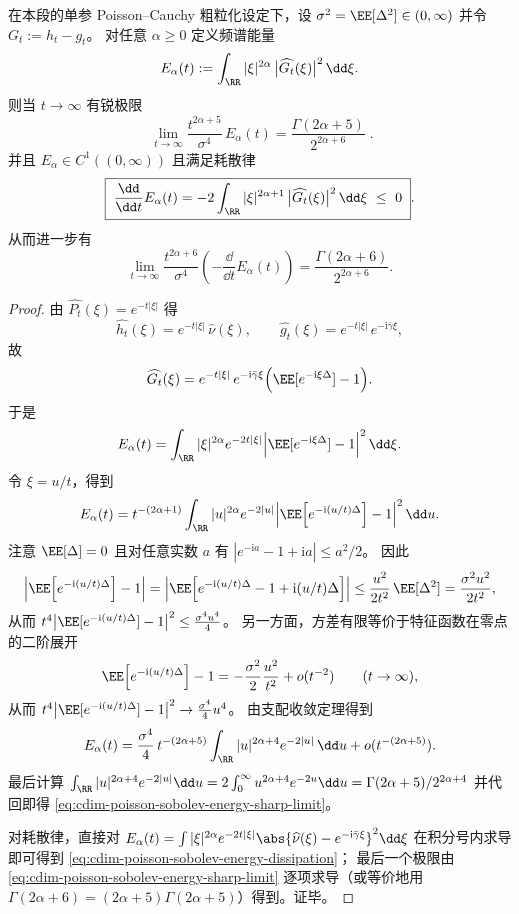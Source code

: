 \begin{proposition}\label{prop:cdim-poisson-sobolev-energy-sharp-limit}
在本段的单参 Poisson--Cauchy 粗粒化设定下，设 \(\sigma^2=\EE[\Delta^2]\in(0,\infty)\) 并令 \(G_t:=h_t-g_t\)。
对任意 \(\alpha\ge 0\) 定义频谱能量
\[
E_\alpha(t):=\int_{\RR}|\xi|^{2\alpha}\,\bigl|\widehat{G_t}(\xi)\bigr|^2\,\dd\xi.
\]
则当 \(t\to\infty\) 有锐极限
\begin{equation}\label{eq:cdim-poisson-sobolev-energy-sharp-limit}
\boxed{\;
\lim_{t\to\infty}\frac{t^{2\alpha+5}}{\sigma^4}\,E_\alpha(t)=\frac{\Gamma(2\alpha+5)}{2^{2\alpha+6}}\; }.
\end{equation}
并且 \(E_\alpha\in C^1((0,\infty))\) 且满足耗散律
\begin{equation}\label{eq:cdim-poisson-sobolev-energy-dissipation}
\boxed{\;
\frac{\dd}{\dd t}E_\alpha(t)=-2\int_{\RR}|\xi|^{2\alpha+1}\,\bigl|\widehat{G_t}(\xi)\bigr|^2\,\dd\xi\ \le\ 0\; }.
\end{equation}
从而进一步有
\[
\lim_{t\to\infty}\frac{t^{2\alpha+6}}{\sigma^4}\left(-\frac{\dd}{\dd t}E_\alpha(t)\right)
=\frac{\Gamma(2\alpha+6)}{2^{2\alpha+6}}.
\]
\end{proposition}
\begin{proof}
由 \(\widehat{P_t}(\xi)=e^{-t|\xi|}\) 得
\[
\widehat{h_t}(\xi)=e^{-t|\xi|}\,\widehat\nu(\xi),
\qquad
\widehat{g_t}(\xi)=e^{-t|\xi|}\,e^{-\mathrm{i}\bar\gamma\xi},
\]
故
\[
\widehat{G_t}(\xi)=e^{-t|\xi|}\,e^{-\mathrm{i}\bar\gamma\xi}\Bigl(\EE[e^{-\mathrm{i}\xi\Delta}]-1\Bigr).
\]
于是
\[
E_\alpha(t)=\int_{\RR}|\xi|^{2\alpha}e^{-2t|\xi|}\Bigl|\EE[e^{-\mathrm{i}\xi\Delta}]-1\Bigr|^2\,\dd\xi.
\]
令 \(\xi=u/t\)，得到
\[
E_\alpha(t)=t^{-(2\alpha+1)}\int_{\RR}|u|^{2\alpha}e^{-2|u|}\Bigl|\EE\!\left[e^{-\mathrm{i}(u/t)\Delta}\right]-1\Bigr|^2\,\dd u.
\]
注意 \(\EE[\Delta]=0\) 且对任意实数 \(a\) 有 \(|e^{-\mathrm{i}a}-1+\mathrm{i}a|\le a^2/2\)。
因此
\[
\left|\EE\!\left[e^{-\mathrm{i}(u/t)\Delta}\right]-1\right|
=\left|\EE\!\left[e^{-\mathrm{i}(u/t)\Delta}-1+\mathrm{i}(u/t)\Delta\right]\right|
\le \frac{u^2}{2t^2}\,\EE[\Delta^2]=\frac{\sigma^2u^2}{2t^2},
\]
从而 \(t^4\bigl|\EE[e^{-\mathrm{i}(u/t)\Delta}]-1\bigr|^2\le \frac{\sigma^4u^4}{4}\)。
另一方面，方差有限等价于特征函数在零点的二阶展开
\[
\EE\!\left[e^{-\mathrm{i}(u/t)\Delta}\right]-1=-\frac{\sigma^2}{2}\frac{u^2}{t^2}+o(t^{-2})\qquad(t\to\infty),
\]
从而 \(t^4\bigl|\EE[e^{-\mathrm{i}(u/t)\Delta}]-1\bigr|^2\to \frac{\sigma^4}{4}u^4\)。
由支配收敛定理得到
\[
E_\alpha(t)
=\frac{\sigma^4}{4}\,t^{-(2\alpha+5)}\int_{\RR}|u|^{2\alpha+4}e^{-2|u|}\,\dd u+o(t^{-(2\alpha+5)}).
\]
最后计算
\(
\int_{\RR}|u|^{2\alpha+4}e^{-2|u|}\dd u
=2\int_0^\infty u^{2\alpha+4}e^{-2u}\dd u
=\Gamma(2\alpha+5)/2^{2\alpha+4}
\)
并代回即得 \eqref{eq:cdim-poisson-sobolev-energy-sharp-limit}。
\par
对耗散律，直接对 \(E_\alpha(t)=\int |\xi|^{2\alpha}e^{-2t|\xi|}\abs{\widehat\nu(\xi)-e^{-\mathrm{i}\bar\gamma\xi}}^{2}\dd\xi\) 在积分号内求导即可得到 \eqref{eq:cdim-poisson-sobolev-energy-dissipation}；
最后一个极限由 \eqref{eq:cdim-poisson-sobolev-energy-sharp-limit} 逐项求导（或等价地用 \(\Gamma(2\alpha+6)=(2\alpha+5)\Gamma(2\alpha+5)\)）得到。证毕。
\end{proof}
\endinput
